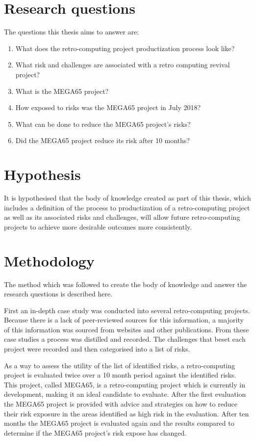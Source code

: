\section{Research questions}
The questions this thesis aims to answer are:
\begin{enumerate}
\item What does the retro-computing project productization process look like?
\item What risk and challenges are associated with a retro computing revival project?
\item What is the MEGA65 project? 
\item How exposed to risks was the MEGA65 project in July 2018?
\item What can be done to reduce the MEGA65 project's risks?
\item Did the MEGA65 project reduce its risk after 10 months?
\end{enumerate}


\section{Hypothesis}
It is hypothesised that the body of knowledge created as part of this thesis, which includes a definition of the process to productization of a retro-computing project as well as its associated risks and challenges, will allow future retro-computing projects to achieve more desirable outcomes more consistently.


\section{Methodology}
The method which was followed to create the body of knowledge and answer the research questions is described here. 

First an in-depth case study was conducted into several retro-computing projects. Because there is a lack of peer-reviewed sources for this information, a majority of this information was sourced from websites and other publications. From these case studies a process was distilled and recorded. The challenges that beset each project were recorded and then categorised into a list of risks. 

As a way to assess the utility of the list of identified risks, a retro-computing project is evaluated twice over a 10 month period against the identified risks. This project, called MEGA65, is a retro-computing project which is currently in development, making it an ideal candidate to evaluate. After the first evaluation the MEGA65 project is provided with advice and strategies on how to reduce their risk exposure in the areas identified as high risk in the evaluation. After ten months the MEGA65 project is evaluated again and the results compared to determine if the MEGA65 project's risk expose has changed. 

